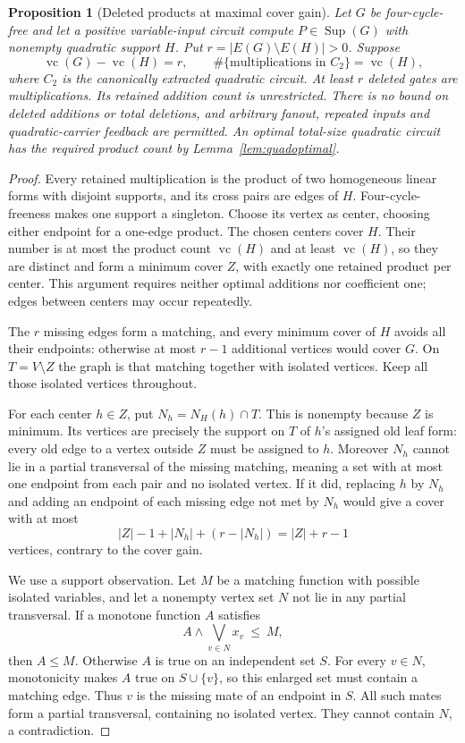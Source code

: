 \documentclass[11pt]{article}
\newcommand{\Sup}{\operatorname{Sup}}
\newcommand{\vc}{\operatorname{vc}}
\newtheorem{proposition}[theorem]{Proposition}
\theoremstyle{definition}
\theoremstyle{remark}
\begin{document}
\begin{proposition}[Deleted products at maximal cover gain]\label{prop:maxgainproducts}
Let $G$ be four-cycle-free and let a positive variable-input circuit compute $P\in\Sup(G)$ with nonempty quadratic support $H$. Put $r=|E(G)\setminus E(H)|>0$. Suppose
\[
 \vc(G)-\vc(H)=r,
 \qquad \#\{\text{multiplications in }C_2\}=\vc(H),
\]
where $C_2$ is the canonically extracted quadratic circuit. At least $r$ deleted gates are multiplications. Its retained addition count is unrestricted. There is no bound on deleted additions or total deletions, and arbitrary fanout, repeated inputs and quadratic-carrier feedback are permitted. An optimal total-size quadratic circuit has the required product count by Lemma~\ref{lem:quadoptimal}.
\end{proposition}
\begin{proof}
Every retained multiplication is the product of two homogeneous linear forms with disjoint supports, and its cross pairs are edges of $H$. Four-cycle-freeness makes one support a singleton. Choose its vertex as center, choosing either endpoint for a one-edge product. The chosen centers cover $H$. Their number is at most the product count $\vc(H)$ and at least $\vc(H)$, so they are distinct and form a minimum cover $Z$, with exactly one retained product per center. This argument requires neither optimal additions nor coefficient one; edges between centers may occur repeatedly.

The $r$ missing edges form a matching, and every minimum cover of $H$ avoids all their endpoints: otherwise at most $r-1$ additional vertices would cover $G$. On $T=V\setminus Z$ the graph is that matching together with isolated vertices. Keep all those isolated vertices throughout.

For each center $h\in Z$, put $N_h=N_H(h)\cap T$. This is nonempty because $Z$ is minimum. Its vertices are precisely the support on $T$ of $h$'s assigned old leaf form: every old edge to a vertex outside $Z$ must be assigned to $h$. Moreover $N_h$ cannot lie in a partial transversal of the missing matching, meaning a set with at most one endpoint from each pair and no isolated vertex. If it did, replacing $h$ by $N_h$ and adding an endpoint of each missing edge not met by $N_h$ would give a cover with at most
\[
 |Z|-1+|N_h|+(r-|N_h|)=|Z|+r-1
\]
vertices, contrary to the cover gain.

We use a support observation. Let $M$ be a matching function with possible isolated variables, and let a nonempty vertex set $N$ not lie in any partial transversal. If a monotone function $A$ satisfies
\[
 A\wedge\bigvee_{v\in N}x_v\ \le\ M,
\]
then $A\le M$. Otherwise $A$ is true on an independent set $S$. For every $v\in N$, monotonicity makes $A$ true on $S\cup\{v\}$, so this enlarged set must contain a matching edge. Thus $v$ is the missing mate of an endpoint in $S$. All such mates form a partial transversal, containing no isolated vertex. They cannot contain $N$, a contradiction.


\end{proof}
\end{document}
